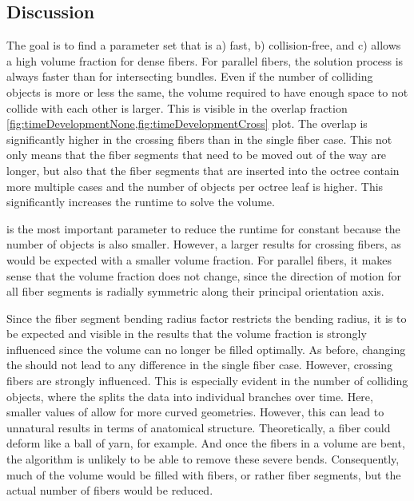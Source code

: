 \subsection{Discussion}
%
The goal is to find a parameter set that is a) fast, b) collision-free, and c) allows a high volume fraction for dense fibers.
For parallel fibers, the solution process is always faster than for intersecting bundles.
Even if the number of colliding objects is more or less the same, the volume required to have enough space to not collide with each other is larger.
This is visible in the overlap fraction \cref{fig:timeDevelopmentNone,fig:timeDevelopmentCross} plot.
The overlap is significantly higher in the crossing fibers than in the single fiber case.
This not only means that the fiber segments that need to be moved out of the way are longer, but also that the fiber segments that are inserted into the octree contain more multiple cases and the number of objects per octree leaf is higher.
This significantly increases the runtime to solve the volume.
\par
%
\segLengthFactor{} is the most important parameter to reduce the runtime for constant \fiberRadiusMean{} because the number of objects is also smaller.
However, a larger \segLengthFactor{} results for crossing fibers, as would be expected with a smaller volume fraction.
For parallel fibers, it makes sense that the volume fraction does not change, since the direction of motion for all fiber segments is radially symmetric along their principal orientation axis.
\par
%
Since the fiber segment bending radius factor \segRadiusFactor{} restricts the bending radius, it is to be expected and visible in the results that the volume fraction is strongly influenced since the volume can no longer be filled optimally.
As before, changing the \segRadiusFactor{} should not lead to any difference in the single fiber case.
However, crossing fibers are strongly influenced.
This is especially evident in the number of colliding objects, where the \segRadiusFactor{} splits the data into individual branches over time.
Here, smaller values of \segRadiusFactor{} allow for more curved geometries.
However, this can lead to unnatural results in terms of anatomical structure.
Theoretically, a fiber could deform like a ball of yarn, for example.
And once the fibers in a volume are bent, the algorithm is unlikely to be able to remove these severe bends.
Consequently, much of the volume would be filled with fibers, or rather fiber segments, but the actual number of fibers would be reduced.
